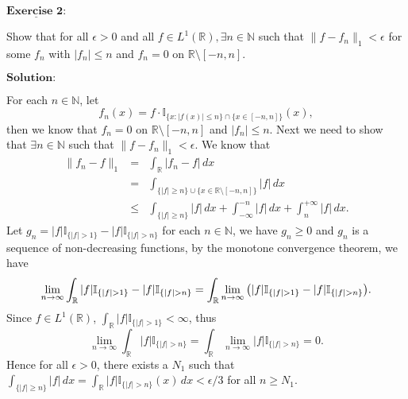 \documentclass[12pt,a4paper]{ctexart}
\begin{document}
\newpage

$\underline{\textbf{Exercise 2:}}$

Show that for all $\epsilon > 0$ and all $f \in L^{1}(\mathbb{R}), \exists n \in \mathbb{N}$ such that $\|f - f_{n}\|_{1} < \epsilon$ for some $f_{n}$ with $|f_{n}| \leq n$ and $f_{n} = 0$ on $\mathbb{R} \setminus [-n, n]$.
 
\vspace{8pt}
$\textbf{Solution:}$

For each $n \in \mathbb N$, let
\begin{equation*}
    f_{n} (x) = f \cdot \mathbb{I}_{\{x: |f(x)| \leq n\} \cap \{x \in [-n, n]\}} (x),
\end{equation*}
then we know that $f_{n} = 0$ on $\mathbb{R} \setminus [-n, n]$ and $|f_{n}| \leq n$. Next we need to show that $\exists n \in \mathbb{N}$ such that $\|f - f_{n}\|_{1} < \epsilon$. We know that
\begin{eqnarray*}
    \|f_{n} - f\|_{1} &=& \int_{\mathbb{R}}^{} |f_{n} - f| \, d x \\
    &=& \int_{\{|f| \geq n\} \cup \{x \in \mathbb{R} \setminus [-n, n]\}}^{} |f| \, d x  \\
    & \leq &  \int_{\{|f| \geq n\}}^{} |f| \, d x + \int_{-\infty}^{-n} |f| \, d x + \int_{n}^{+\infty} |f| \, d x .
\end{eqnarray*}
Let $g_n = |f| \mathbb I_{ \{ |f| > 1 \} } - |f| \mathbb I_{ \{ |f| > n \} }$ for each $n \in \mathbb N$, we have $g_n \geq 0$ and $g_n$ is a sequence of non-decreasing functions, by the monotone convergence theorem, we have
$$\lim_{n \to \infty} \int_{\mathbb R} |f| \mathbb I_{ \{ |f| > 1 \} } - |f| \mathbb I_{ \{ |f| > n \} } = \int_{\mathbb R} \lim_{n \to \infty} \big{(} |f| \mathbb I_{ \{ |f| > 1 \} } - |f| \mathbb I_{ \{ |f| > n \} } \big{)}.$$
Since $f \in L^1(\mathbb R)$, $\int_{\mathbb R} |f| \mathbb I_{\{|f| > 1\}} < \infty$, thus
$$\lim_{n \to \infty} \int_{\mathbb R} |f| \mathbb I_{ \{ |f| > n \} } = \int_{\mathbb R} \lim_{n \to \infty} |f| \mathbb I_{ \{ |f| > n \} } = 0.$$
Hence for all $\epsilon > 0$, there exists a $N_1$ such that $\int_{\{|f| \geq n\}}^{} |f| \, d x = \int_{\mathbb{R}}^{} |f| \mathbb{I}_{\{|f|>n\}} (x) \, d x < \epsilon/3$ for all $n \geq N_1$.
\end{document}

